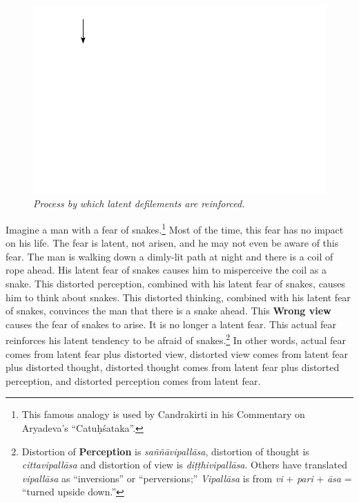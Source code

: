 \begin{figure}[h]
\centering
\includegraphics[width=1\linewidth]{./Diagrams/Latent}
\caption{\textit{\small Process by which latent defilements are reinforced.}}
\label{fig:Latent}
\end{figure}

Imagine a man with a fear of snakes.\footnote{This famous analogy is used by Candrakirti in his Commentary on Aryadeva’s “Catuḥśataka”.} Most of the time, this fear has no impact on his life. The fear is latent, not arisen, and he may not even be aware of this fear. The man is walking down a dimly-lit path at night and there is a coil of rope ahead. His latent fear of snakes causes him to misperceive the coil as a snake. This distorted perception, combined with his latent fear of snakes, causes him to think about snakes. This distorted thinking, combined with his latent fear of snakes, convinces the man that there is a snake ahead. This \textbf{Wrong view} causes the fear of snakes to arise. It is no longer a latent fear. This actual fear reinforces his latent tendency to be afraid of snakes.\footnote{Distortion of \textbf{Perception} is \textit{saññāvipallāsa}, distortion of thought is \textit{cittavipallāsa} and distortion of view is \textit{diṭṭhivipallāsa}. Others have translated \textit{vipallāsa} as “inversions” or “perversions;” \textit{Vipallāsa} is from \textit{vi} + \textit{pari} + \textit{āsa} = “turned upside down.”} In other words, actual fear comes from latent fear plus distorted view, distorted view comes from latent fear plus distorted thought, distorted thought comes from latent fear plus distorted perception, and distorted perception comes from latent fear.

